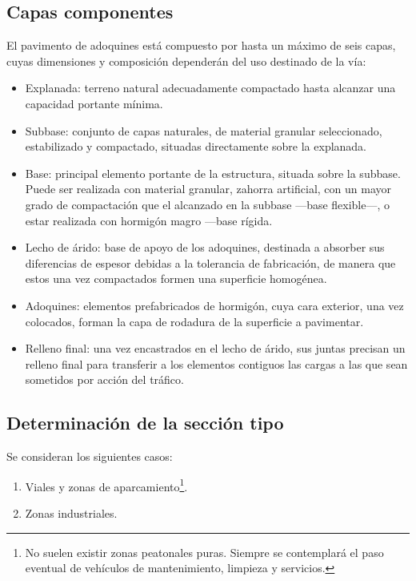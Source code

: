 \subsection{Capas componentes}

El pavimento de adoquines está compuesto por hasta un máximo de seis capas, cuyas dimensiones y composición dependerán del uso destinado de la vía:

\begin{itemize}
\item Explanada: terreno natural adecuadamente compactado hasta alcanzar una capacidad portante mínima.
\item Subbase: conjunto de capas naturales, de material granular seleccionado, estabilizado y compactado, situadas directamente sobre la explanada.
\item Base: principal elemento portante de la estructura, situada sobre la subbase. Puede ser realizada con material granular, zahorra artificial, con un mayor grado de compactación que el alcanzado en la subbase —base flexible—, o estar realizada con hormigón magro —base rígida.
\item Lecho de árido: base de apoyo de los adoquines, destinada a absorber sus diferencias de espesor debidas a la tolerancia de fabricación, de manera que estos una vez compactados formen una superficie homogénea.
\item Adoquines: elementos prefabricados de hormigón, cuya cara exterior, una vez colocados, forman la capa de rodadura de la superficie a pavimentar.
\item Relleno final: una vez encastrados en el lecho de árido, sus juntas precisan un relleno final para transferir a los elementos contiguos las cargas a las que sean sometidos por acción del tráfico.
\end{itemize}

\subsection{Determinación de la sección tipo}\label{sec:secciontipo}

Se consideran los siguientes casos:

\begin{enumerate}
\item Viales y zonas de aparcamiento\footnote{No suelen existir zonas peatonales puras. Siempre se contemplará el paso eventual de vehículos de mantenimiento, limpieza y servicios.}.
\item Zonas industriales.
\end{enumerate}

